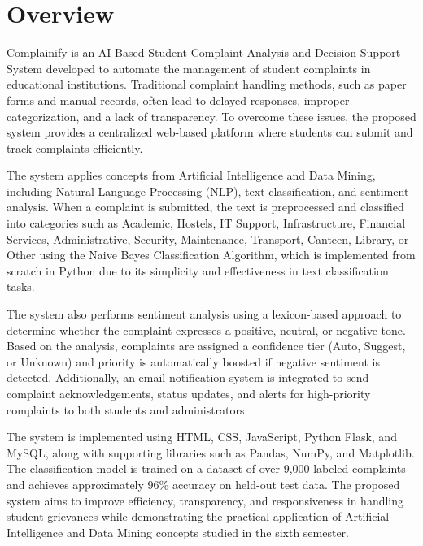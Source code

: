\documentclass[12pt,a4paper]{report}
\begin{document}
\section{Overview}
Complainify is an AI-Based Student Complaint Analysis and Decision Support System developed to automate the management of student complaints in educational institutions. Traditional complaint handling methods, such as paper forms and manual records, often lead to delayed responses, improper categorization, and a lack of transparency. To overcome these issues, the proposed system provides a centralized web-based platform where students can submit and track complaints efficiently.

The system applies concepts from Artificial Intelligence and Data Mining, including Natural Language Processing (NLP), text classification, and sentiment analysis. When a complaint is submitted, the text is preprocessed and classified into categories such as Academic, Hostels, IT Support, Infrastructure, Financial Services, Administrative, Security, Maintenance, Transport, Canteen, Library, or Other using the Naive Bayes Classification Algorithm, which is implemented from scratch in Python due to its simplicity and effectiveness in text classification tasks.

The system also performs sentiment analysis using a lexicon-based approach to determine whether the complaint expresses a positive, neutral, or negative tone. Based on the analysis, complaints are assigned a confidence tier (Auto, Suggest, or Unknown) and priority is automatically boosted if negative sentiment is detected. Additionally, an email notification system is integrated to send complaint acknowledgements, status updates, and alerts for high-priority complaints to both students and administrators.

The system is implemented using HTML, CSS, JavaScript, Python Flask, and MySQL, along with supporting libraries such as Pandas, NumPy, and Matplotlib. The classification model is trained on a dataset of over 9,000 labeled complaints and achieves approximately 96\% accuracy on held-out test data. The proposed system aims to improve efficiency, transparency, and responsiveness in handling student grievances while demonstrating the practical application of Artificial Intelligence and Data Mining concepts studied in the sixth semester.
\end{document}
